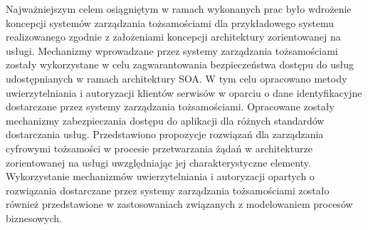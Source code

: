 	Najważniejszym celem osiągniętym w ramach wykonanych prac było wdrożenie koncepcji systemów zarządzania tożsamościami dla przykładowego systemu realizowanego zgodnie z założeniami koncepcji architektury zorientowanej na usługi. Mechanizmy wprowadzane przez systemy zarządzania tożsamościami zostały wykorzystane w celu zagwarantowania bezpieczeństwa dostępu do usług udostępnianych w ramach architektury SOA. W tym celu opracowano metody uwierzytelniania i autoryzacji klientów serwisów w oparciu o dane identyfikacyjne dostarczane przez systemy zarządzania tożsamościami. Opracowane zostały mechanizmy zabezpieczania dostępu do aplikacji dla różnych standardów dostarczania usług. Przedstawiono propozycje rozwiązań dla zarządzania cyfrowymi tożsamości w procesie przetwarzania żądań w architekturze zorientowanej na usługi uwzględniając jej charakterystyczne elementy. Wykorzystanie mechanizmów uwierzytelniania i autoryzacji opartych o rozwiązania dostarczane przez systemy zarządzania tożsamościami zostało również przedstawione w zastosowaniach związanych z modelowaniem procesów biznesowych.
